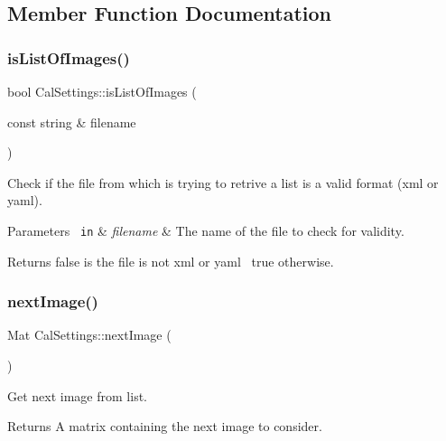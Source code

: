 \subsection{Member Function Documentation}
\mbox{\label{class_cal_settings_a43c8b23d4f8d7c8cb1fd9204e9478ce0}} 
\subsubsection{\texorpdfstring{isListOfImages()}{isListOfImages()}}
{\footnotesize\ttfamily bool Cal\+Settings\+::is\+List\+Of\+Images (\begin{DoxyParamCaption}\item[{const string \&}]{filename }\end{DoxyParamCaption})\hspace{0.3cm}{\ttfamily [static]}}



Check if the file from which is trying to retrive a list is a valid format (xml or yaml). 


\begin{DoxyParams}[1]{Parameters}
\mbox{\texttt{ in}}  & {\em filename} & The name of the file to check for validity. \\
\hline
\end{DoxyParams}
\begin{DoxyReturn}{Returns}
{\ttfamily false} is the file is not xml or yaml~\newline
 {\ttfamily true} otherwise. 
\end{DoxyReturn}
\mbox{\label{class_cal_settings_ad68c39e7310537b4eb00b244da338b17}} 
\subsubsection{\texorpdfstring{nextImage()}{nextImage()}}
{\footnotesize\ttfamily Mat Cal\+Settings\+::next\+Image (\begin{DoxyParamCaption}{ }\end{DoxyParamCaption})}



Get next image from list. 

\begin{DoxyReturn}{Returns}
A matrix containing the next image to consider. 
\end{DoxyReturn}
\mbox{\label{class_cal_settings_a984d8ace934885b4da7bad3618db714d}} 
